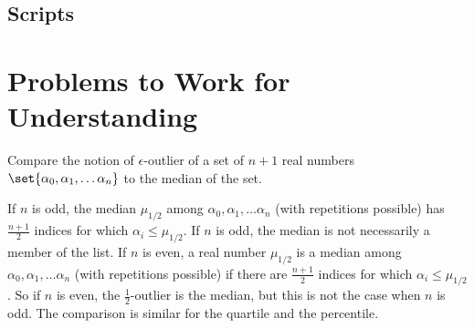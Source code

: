 \documentclass[12pt]{article}
\begin{document}
\subsection*{Scripts}



\hr

\section*{Problems to Work for Understanding}
\renewcommand{\theexerciseseries}{}
\renewcommand{\theexercise}{\arabic{exercise}}

\begin{exercise}
    Compare the notion of \( \epsilon \)-outlier of a set of \( n+1 \)
    real numbers \( \set{\alpha_0, \alpha_1, \dots \alpha_n} \) to the
    median of the set.
\end{exercise}
\begin{solution}
    If \( n \) is odd, the median \( \mu_{1/2} \) among \( \alpha_0,
    \alpha_1, \dots \alpha_n \) (with repetitions possible) has \( \frac
    {n+1}{2} \) indices for which \( \alpha_i \le \mu_{1/2} \).  If \( n
    \) is odd, the median is not necessarily a member of the list.  If \(
    n \) is even, a real number \( \mu_{1/2} \) is a median among \(
    \alpha_0, \alpha_1, \dots \alpha_n \) (with repetitions possible) if
    there are \( \frac{n+1}{2} \) indices for which \( \alpha_i \le \mu_
    {1/2} \).  So if \( n \) is even, the \( \frac{1}{2} \)-outlier is
    the median, but this is not the case when \( n \) is odd.  The
    comparison is similar for the quartile and the percentile.
\end{solution}
\end{document}

